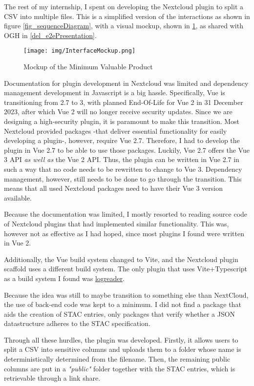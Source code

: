\documentclass[journal, dvipsnames]{IEEEtran}
\begin{document}
The rest of my internship, I spent on developing the Nextcloud plugin to split a CSV into multiple files. This is a simplified version of the interactions as shown in figure \ref{fig_sequenceDiagram}, with a visual mockup, shown in \ref{fig_sharingMockup}, as shared with OGH in \ref{del_e2ePresentation}.

\begin{figure}
  \centering
  \texttt{[image: img/InterfaceMockup.png]}
  \caption{Mockup of the Minimum Valuable Product}
  \label{fig_sharingMockup}
\end{figure}

Documentation for plugin development in Nextcloud was limited and dependency management development in Javascript is a big hassle.
Specifically, Vue is transitioning from 2.7 to 3, with planned End-Of-Life for Vue 2 in 31 December 2023, after which Vue 2 will no longer receive security updates.
Since we are designing a high-security plugin, it is paramount to make this transition.
Most Nextcloud provided packages -that deliver essential functionality for easily developing a plugin-, however, require Vue 2.7. Therefore, I had to develop the plugin in Vue 2.7 to be able to use those packages.
Luckily, Vue 2.7 offers the Vue 3 API \textit{as well as} the Vue 2 API. Thus, the plugin can be written in Vue 2.7 in such a way that no code needs to be rewritten to change to Vue 3. Dependency management, however, still needs to be done to go through the transition. This means that all used Nextcloud packages need to have their Vue 3 version available.

Because the documentation was limited, I mostly resorted to reading source code of Nextcloud plugins that had implemented similar functionality. This was, however not as effective as I had hoped, since most plugins I found were written in Vue 2.

Additionally, the Vue build system changed to Vite, and the Nextcloud plugin scaffold uses a different build system. The only plugin that uses Vite+Typescript as a build system I found was \href{https://github.com/nextcloud/logreader}{logreader}.

Because the idea was still to maybe transition to something else than NextCloud, the use of back-end code was kept to a minimum. I did not find a package that aids the creation of STAC entries, only packages that verify whether a JSON datastructure adheres to the STAC specification.

Through all these hurdles, the plugin was developed. Firstly, it allows users to split a CSV into sensitive columns and uploads them to a folder whose name is deterministically determined from the filename. Then, the remaining public columns are put in a \textit{"public"} folder together with the STAC entries, which is retrievable through a link share.
\end{document}
